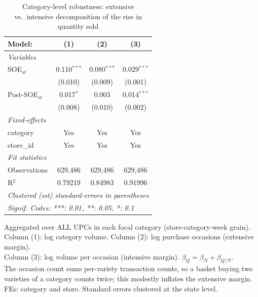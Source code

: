 
\begin{table}[htbp]
   \caption{\label{tab:category_decomp} Category-level robustness: extensive vs.\ intensive decomposition of the rise in quantity sold}
   \centering
   \begin{tabular}{lccc}
      \tabularnewline \midrule \midrule
      Model:          & (1)           & (2)           & (3)\\  
      \midrule
      \emph{Variables}\\
      SOE$_{st}$      & 0.110$^{***}$ & 0.080$^{***}$ & 0.029$^{***}$\\   
                      & (0.010)       & (0.009)       & (0.001)\\   
      Post-SOE$_{st}$ & 0.017$^{*}$   & 0.003         & 0.014$^{***}$\\   
                      & (0.008)       & (0.010)       & (0.002)\\   
      \midrule
      \emph{Fixed-effects}\\
      category        & Yes           & Yes           & Yes\\  
      store\_id       & Yes           & Yes           & Yes\\  
      \midrule
      \emph{Fit statistics}\\
      Observations    & 629,486       & 629,486       & 629,486\\  
      R$^2$           & 0.79219       & 0.84983       & 0.91996\\  
      \midrule \midrule
      \multicolumn{4}{l}{\emph{Clustered (sst) standard-errors in parentheses}}\\
      \multicolumn{4}{l}{\emph{Signif. Codes: ***: 0.01, **: 0.05, *: 0.1}}\\
   \end{tabular}
   
   \par \raggedright 
   Aggregated over ALL UPCs in each focal category (store-category-week grain).\\
   Column (1): log category volume. Column (2): log purchase occasions (extensive margin).\\
   Column (3): log volume per occasion (intensive margin). $\beta_Q = \beta_N + \beta_{Q/N}$.\\
   The occasion count sums per-variety transaction counts, so a basket buying two\\
   varieties of a category counts twice; this modestly inflates the extensive margin.\\
   FEs: category and store. Standard errors clustered at the state level.
\end{table}


